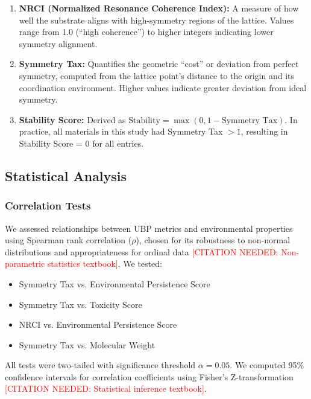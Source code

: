 \documentclass[11pt,letterpaper]{article}
\begin{document}
\begin{enumerate}
    \item \textbf{NRCI (Normalized Resonance Coherence Index):} A measure of how well the substrate aligns with high-symmetry regions of the lattice. Values range from 1.0 (``high coherence'') to higher integers indicating lower symmetry alignment.

    \item \textbf{Symmetry Tax:} Quantifies the geometric ``cost'' or deviation from perfect symmetry, computed from the lattice point's distance to the origin and its coordination environment. Higher values indicate greater deviation from ideal symmetry.

    \item \textbf{Stability Score:} Derived as $\text{Stability} = \max(0, 1 - \text{Symmetry Tax})$. In practice, all materials in this study had Symmetry Tax $> 1$, resulting in Stability Score = 0 for all entries.
\end{enumerate}

\subsection{Statistical Analysis}

\subsubsection{Correlation Tests}
We assessed relationships between UBP metrics and environmental properties using Spearman rank correlation ($\rho$), chosen for its robustness to non-normal distributions and appropriateness for ordinal data \textcolor{red}{[CITATION NEEDED: Non-parametric statistics textbook]}. We tested:

\begin{itemize}
    \item Symmetry Tax vs. Environmental Persistence Score
    \item Symmetry Tax vs. Toxicity Score
    \item NRCI vs. Environmental Persistence Score
    \item Symmetry Tax vs. Molecular Weight
\end{itemize}

All tests were two-tailed with significance threshold $\alpha = 0.05$. We computed 95\% confidence intervals for correlation coefficients using Fisher's Z-transformation \textcolor{red}{[CITATION NEEDED: Statistical inference textbook]}.
\end{document}
